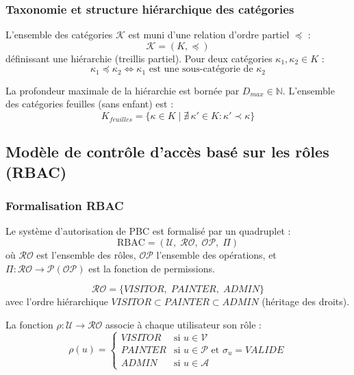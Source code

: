 \documentclass[12pt,a4paper]{report}
\begin{document}
\subsubsection*{Taxonomie et structure hiérarchique des catégories}

L'ensemble des catégories $\mathcal{K}$ est muni d'une relation d'ordre partiel $\preceq$ :
\[
\mathcal{K} = (K, \preceq)
\]
définissant une hiérarchie (treillis partiel). Pour deux catégories $\kappa_1, \kappa_2 \in K$ :
\[
\kappa_1 \preceq \kappa_2 \iff \kappa_1 \text{ est une sous-catégorie de } \kappa_2
\]

La profondeur maximale de la hiérarchie est bornée par $D_{max} \in \mathbb{N}$. L'ensemble
des catégories feuilles (sans enfant) est :
\[
K_{feuilles} = \{\kappa \in K \mid \nexists\, \kappa' \in K : \kappa' \prec \kappa\}
\]

\subsection{Modèle de contrôle d'accès basé sur les rôles (RBAC)}

\subsubsection*{Formalisation RBAC}

Le système d'autorisation de PBC est formalisé par un quadruplet :
\[
\text{RBAC} = (\mathcal{U},\; \mathcal{R\!O},\; \mathcal{O\!P},\; \Pi)
\]
où $\mathcal{R\!O}$ est l'ensemble des rôles, $\mathcal{O\!P}$ l'ensemble des opérations, et
$\Pi : \mathcal{R\!O} \to \mathcal{P}(\mathcal{O\!P})$ est la fonction de permissions.

\begin{definition}
\[
\mathcal{R\!O} = \{VISITOR,\; PAINTER,\; ADMIN\}
\]
avec l'ordre hiérarchique $VISITOR \subset PAINTER \subset ADMIN$ (héritage des droits).
\end{definition}

\begin{definition}
La fonction $\rho : \mathcal{U} \to \mathcal{R\!O}$ associe à chaque utilisateur son rôle :
\[
\rho(u) =
\begin{cases}
VISITOR & \text{si } u \in \mathcal{V} \\
PAINTER & \text{si } u \in \mathcal{P} \text{ et } \sigma_u = VALIDE \\
ADMIN   & \text{si } u \in \mathcal{A}
\end{cases}
\]
\end{definition}
\end{document}
